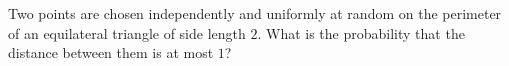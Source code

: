 Two points are chosen independently and uniformly at random on the perimeter of an equilateral triangle of side length $2$. What is the probability that the distance between them is at most $1$?
